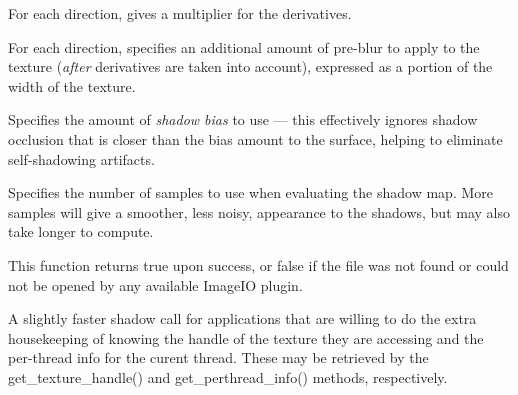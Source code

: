 \vspace{-12pt}
\vspace{10pt}
For each direction, gives a multiplier for the derivatives.
\apiend

\vspace{-24pt}
\vspace{10pt}
For each direction, specifies an additional amount of pre-blur to apply
to the texture (\emph{after} derivatives are taken into account),
expressed as a portion of the width of the texture.
\apiend

\vspace{-24pt}
\vspace{10pt}
Specifies the amount of \emph{shadow bias} to use --- this effectively
ignores shadow occlusion that is closer than the bias amount to the
surface, helping to eliminate self-shadowing artifacts.
\apiend

\vspace{-24pt}
\vspace{10pt}
Specifies the number of samples to use when evaluating the shadow map.
More samples will give a smoother, less noisy, appearance to the
shadows, but may also take longer to compute.
\apiend

This function returns {\cf true} upon success, or {\cf false} if the
file was not found or could not be opened by any available ImageIO
plugin.
\apiend

A slightly faster {\cf shadow} call for applications that are willing
to do the extra housekeeping of knowing the handle of the texture they
are accessing and the per-thread info for the curent thread.  These
may be retrieved by the {\cf get_texture_handle()} and 
{\cf get_perthread_info()} methods, respectively.
\apiend


